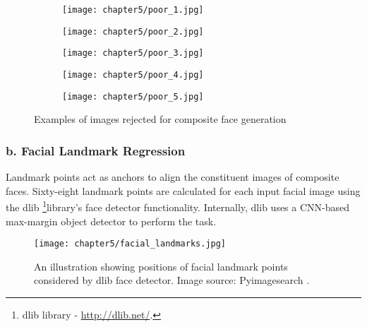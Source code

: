 \documentclass[../report.tex]{subfiles}
\begin{document}
       \begin{figure}[H]
    	   	\centering
    	   	\begin{subfigure}[b]{0.17\textwidth}
    		   		\centering
    		   		\texttt{[image: chapter5/poor\_1.jpg]}
    		   	\end{subfigure}
    	   	\begin{subfigure}[b]{0.17\textwidth}
    		   		\centering
    		   		\texttt{[image: chapter5/poor\_2.jpg]}
    		   	\end{subfigure}
    	   		\begin{subfigure}[b]{0.17\textwidth}
    	   		\centering
    	   		\texttt{[image: chapter5/poor\_3.jpg]}
    	   	\end{subfigure}
       		\begin{subfigure}[b]{0.17\textwidth}
       			\centering
       			\texttt{[image: chapter5/poor\_4.jpg]}
       		\end{subfigure}
       			\begin{subfigure}[b]{0.17\textwidth}
       			\centering
       			\texttt{[image: chapter5/poor\_5.jpg]}
       		\end{subfigure}
    	   	\caption{Examples of images rejected for composite face generation}
    	   	\label{fig_gmdb_poorq}
    	   \end{figure}
    \subsubsection{b. Facial Landmark Regression}
    Landmark points act as anchors to align the constituent images of composite faces. Sixty-eight landmark points are calculated for each input facial image using the dlib \footnote{dlib library - \url{http://dlib.net/}.}library's face detector functionality. Internally, dlib uses a CNN-based max-margin object detector to perform the task.
        \begin{figure}[H]
        \centering
    	\hspace*{0cm}      
    	\texttt{[image: chapter5/facial\_landmarks.jpg]}
    	\caption[An illustration showing positions of facial landmark points considered by dlib face detector]{An illustration showing positions of facial landmark points considered by dlib face detector. Image source: Pyimagesearch \protect\footnotemark.}
    	\label{fig_gm_pipeline}
    \end{figure}
\end{document}
